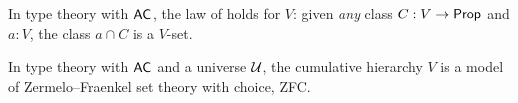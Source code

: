 \documentclass[hott-all.tex]{subfiles}
\begin{document}
% 
% 
\begin{lem}
  In type theory with $\mathsf{AC}_{}$, the law of 
  holds for $V$: given \emph{any} class $C : V \to \mathsf{Prop}$ and $a : V$, the class $a \cap C$ is a $V$-set.
\end{lem}
% 
\begin{thm}
In type theory with $\mathsf{AC}_{}$ and a universe $\mathcal{U}$, the cumulative hierarchy $V$ is a model of Zermelo--Fraenkel set theory with choice, ZFC.
\end{thm}
% 
% 
% 
\sectionNotes
% 
\end{document}
